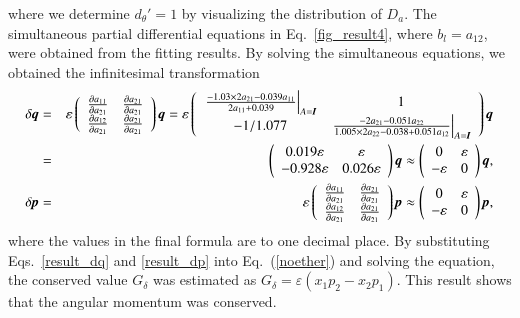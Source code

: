 \documentclass[preprint,
bibnotes,
 amsmath,amssymb,
 aps,
]{revtex4-1}
\begin{document}
where we determine $d_{\theta}'=1$ by visualizing the distribution of $D_a$. 
The simultaneous partial differential equations in Eq.~\eqref{fig_result4}, where $b_l = a_{12}$, were obtained from the fitting results. By solving the simultaneous equations, we obtained the infinitesimal transformation
\begin{eqnarray}
\delta \textit{\textbf{q}} &=&
\varepsilon \left(
    \begin{array}{cc}
      \frac{\partial a_{11}}{\partial a_{21}} & \frac{\partial a_{21}}{\partial a_{21}}\\
      \frac{\partial a_{12}}{\partial a_{21}} & \frac{\partial a_{21}}{\partial a_{21}}\\
    \end{array}
  \right)\textit{\textbf{q}} = \varepsilon
  \left(
    \begin{array}{cc}
\left.\frac{-1.03\times 2a_{21}-0.039a_{11}}{2a_{11}+0.039}\right|_{A=\textit{\textbf{I}}}&1\\
-1/1.077 & \left.\frac{-2a_{21} - 0.051a_{22}}{1.005 \times 2a_{22} - 0.038 + 0.051a_{12}}\right|_{A=\textit{\textbf{I}}}
    \end{array}
  \right)\textit{\textbf{q}}\\
&=& \left(
    \begin{array}{cc}0.019\varepsilon & \varepsilon\\
    -0.928\varepsilon&0.026\varepsilon\end{array}
  \right)\textit{\textbf{q}} \approx \left(
    \begin{array}{cc}0&\varepsilon\\-\varepsilon&0\end{array}
  \right)\textit{\textbf{q}},\label{result_dq}\\
\delta \textit{\textbf{p}} &=&
\varepsilon \left(
    \begin{array}{cc}
      \frac{\partial a_{11}}{\partial a_{21}} & \frac{\partial a_{21}}{\partial a_{21}}\\
      \frac{\partial a_{12}}{\partial a_{21}} & \frac{\partial a_{21}}{\partial a_{21}}\\
    \end{array}
  \right)\textit{\textbf{p}} \approx \left(
    \begin{array}{cc}0&\varepsilon\\-\varepsilon&0\end{array}
  \right)\textit{\textbf{p}},\label{result_dp}
\end{eqnarray}
where the values in the final formula are to one decimal place. 
By substituting Eqs.~\eqref{result_dq} and \eqref{result_dp} into Eq.~(\ref{noether}) and solving the equation, the conserved value $G_{\delta}$ was estimated as $G_{\delta} = \varepsilon (x_1p_2 - x_2p_1)$. 
This result shows that the angular momentum was conserved. 
\end{document}
